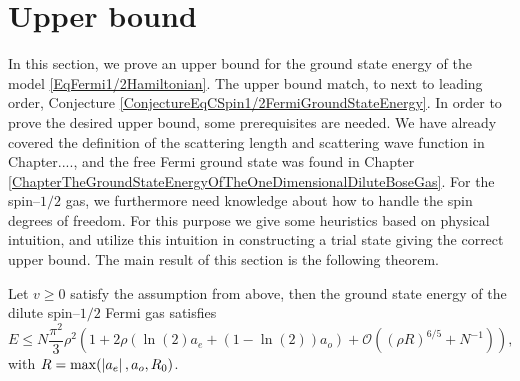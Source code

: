 \section{Upper bound}
In this section, we prove an upper bound for the ground state energy of the model \eqref{EqFermi1/2Hamiltonian}. The upper bound match, to next to leading order, Conjecture \ref{ConjectureEqCSpin1/2FermiGroundStateEnergy}.
In order to prove the desired upper bound, some prerequisites are needed. We have already covered the definition of the scattering length and scattering wave function in Chapter...., and the free Fermi ground state was found in Chapter \eqref{ChapterTheGroundStateEnergyOfTheOneDimensionalDiluteBoseGas}. For the spin--$ 1/2 $ gas, we furthermore need knowledge about how to handle the spin degrees of freedom. For this purpose we give some heuristics based on physical intuition, and utilize this intuition in constructing a trial state giving the correct upper bound. 
The main result of this section is the following theorem.
\begin{theorem}\label{TheoremUpperBoundSpin1/2Fermi}
	Let $ v\geq0 $ satisfy the assumption from above, then the ground state energy of the dilute spin--$ 1/2 $ Fermi gas satisfies\begin{equation}\label{EqUpperBoundSpin1/2Fermi}
	E\leq N\frac{\pi^2}{3}\rho^2\left(1+2\rho \left(\ln(2) a_e+(1-\ln(2))a_o\right)+\mathcal{O}\left((\rho R)^{6/5}+N^{-1}\right)\right),
	\end{equation}
	with $ R=\max(\left\lvert a_e \right\rvert, a_o, R_0) $.
\end{theorem}
